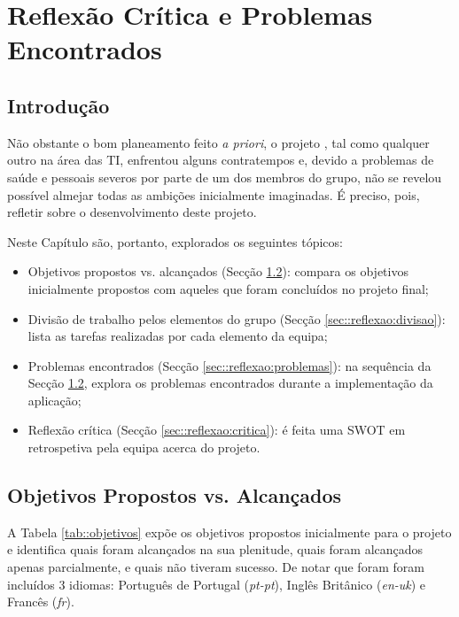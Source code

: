 \chapter{Reflexão Crítica e Problemas Encontrados}
\label{ch::reflexao}

\section{Introdução}
\label{sec::reflexao:intro}

Não obstante o bom planeamento feito \textit{a priori}, o projeto \appname, tal como qualquer outro na área das \ac{TI}, enfrentou alguns contratempos e, devido a problemas de saúde e pessoais severos por parte de um dos membros do grupo, não se revelou possível almejar todas as ambições inicialmente imaginadas. É preciso, pois, refletir sobre o desenvolvimento deste projeto.

Neste Capítulo são, portanto, explorados os seguintes tópicos:

\begin{itemize}
	\item Objetivos propostos vs. alcançados (Secção \ref{sec::reflexao:objetivos}): compara os objetivos inicialmente propostos com aqueles que foram concluídos no projeto final;
	\item Divisão de trabalho pelos elementos do grupo (Secção \ref{sec::reflexao:divisao}): lista as tarefas realizadas por cada elemento da equipa;
	\item Problemas encontrados (Secção \ref{sec::reflexao:problemas}): na sequência da Secção \ref{sec::reflexao:objetivos}, explora os problemas encontrados durante a implementação da aplicação;
	\item Reflexão crítica (Secção \ref{sec::reflexao:critica}): é feita uma \ac{SWOT} em retrospetiva pela equipa acerca do projeto.
\end{itemize}



\section{Objetivos Propostos vs. Alcançados}
\label{sec::reflexao:objetivos}

A Tabela \ref{tab::objetivos} expõe os objetivos propostos inicialmente para o projeto e identifica quais foram alcançados na sua plenitude, quais foram alcançados apenas parcialmente, e quais não tiveram sucesso. De notar que foram foram incluídos 3 idiomas: Português de Portugal (\textit{pt-pt}), Inglês Britânico (\textit{en-uk}) e Francês (\textit{fr}).

